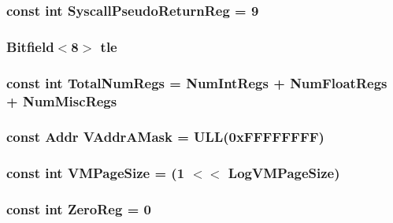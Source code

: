 \label{namespaceSparcISA_ab232c3f77d12da8f20157152adc977bd}
\hypertarget{namespaceSparcISA_ab566b6da98edbb32e80291edaf0906ba}{
\subsubsection[{SyscallPseudoReturnReg}]{\setlength{\rightskip}{0pt plus 5cm}const int {\bf SyscallPseudoReturnReg} = 9}}
\label{namespaceSparcISA_ab566b6da98edbb32e80291edaf0906ba}
\hypertarget{namespaceSparcISA_a25942cc15f91eb94cbc97367b68f0366}{
\subsubsection[{tle}]{\setlength{\rightskip}{0pt plus 5cm}Bitfield$<$8$>$ {\bf tle}}}
\label{namespaceSparcISA_a25942cc15f91eb94cbc97367b68f0366}
\hypertarget{namespaceSparcISA_a578a3508d56f10e933ba9559e2cf907c}{
\subsubsection[{TotalNumRegs}]{\setlength{\rightskip}{0pt plus 5cm}const int {\bf TotalNumRegs} = {\bf NumIntRegs} + {\bf NumFloatRegs} + {\bf NumMiscRegs}}}
\label{namespaceSparcISA_a578a3508d56f10e933ba9559e2cf907c}
\hypertarget{namespaceSparcISA_a23f8389b82b2ea7be78d3f123b91ec4c}{
\subsubsection[{VAddrAMask}]{\setlength{\rightskip}{0pt plus 5cm}const {\bf Addr} {\bf VAddrAMask} = ULL(0xFFFFFFFF)}}
\label{namespaceSparcISA_a23f8389b82b2ea7be78d3f123b91ec4c}
\hypertarget{namespaceSparcISA_a891eaf95159d764e6efae501c2860a3a}{
\subsubsection[{VMPageSize}]{\setlength{\rightskip}{0pt plus 5cm}const int {\bf VMPageSize} = (1 $<$$<$ {\bf LogVMPageSize})}}
\label{namespaceSparcISA_a891eaf95159d764e6efae501c2860a3a}
\hypertarget{namespaceSparcISA_a33dbba4a12f6733a5ecc2d2b3542b7ee}{
\subsubsection[{ZeroReg}]{\setlength{\rightskip}{0pt plus 5cm}const int {\bf ZeroReg} = 0}}
\label{namespaceSparcISA_a33dbba4a12f6733a5ecc2d2b3542b7ee}
